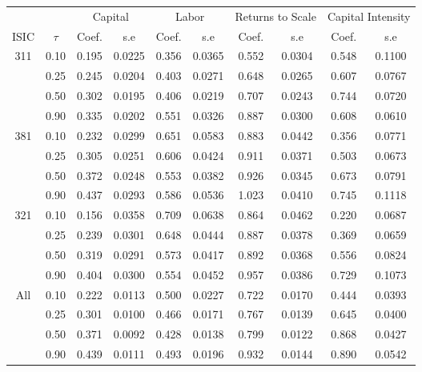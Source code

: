 \begin{table}[H]
\centering
\begin{tabular}{cccccccccc}
  \hline\hline & & \multicolumn{2}{c}{Capital}  & \multicolumn{2}{c}{Labor} & \multicolumn{2}{c}{Returns to Scale} & \multicolumn{2}{c}{Capital Intensity}\\ \cmidrule(lr){3-4} \cmidrule(lr){5-6} \cmidrule(lr){7-8} \cmidrule(lr){9-10}ISIC & $\tau$ & Coef. & s.e & Coef. & s.e & Coef. & s.e & Coef. & s.e \\ 
  \hline
311 & 0.10 & 0.195 & 0.0225 & 0.356 & 0.0365 & 0.552 & 0.0304 & 0.548 & 0.1100 \\ 
   & 0.25 & 0.245 & 0.0204 & 0.403 & 0.0271 & 0.648 & 0.0265 & 0.607 & 0.0767 \\ 
   & 0.50 & 0.302 & 0.0195 & 0.406 & 0.0219 & 0.707 & 0.0243 & 0.744 & 0.0720 \\ 
   & 0.90 & 0.335 & 0.0202 & 0.551 & 0.0326 & 0.887 & 0.0300 & 0.608 & 0.0610 \\ 
  381 & 0.10 & 0.232 & 0.0299 & 0.651 & 0.0583 & 0.883 & 0.0442 & 0.356 & 0.0771 \\ 
   & 0.25 & 0.305 & 0.0251 & 0.606 & 0.0424 & 0.911 & 0.0371 & 0.503 & 0.0673 \\ 
   & 0.50 & 0.372 & 0.0248 & 0.553 & 0.0382 & 0.926 & 0.0345 & 0.673 & 0.0791 \\ 
   & 0.90 & 0.437 & 0.0293 & 0.586 & 0.0536 & 1.023 & 0.0410 & 0.745 & 0.1118 \\ 
  321 & 0.10 & 0.156 & 0.0358 & 0.709 & 0.0638 & 0.864 & 0.0462 & 0.220 & 0.0687 \\ 
   & 0.25 & 0.239 & 0.0301 & 0.648 & 0.0444 & 0.887 & 0.0378 & 0.369 & 0.0659 \\ 
   & 0.50 & 0.319 & 0.0291 & 0.573 & 0.0417 & 0.892 & 0.0368 & 0.556 & 0.0824 \\ 
   & 0.90 & 0.404 & 0.0300 & 0.554 & 0.0452 & 0.957 & 0.0386 & 0.729 & 0.1073 \\ 
  All & 0.10 & 0.222 & 0.0113 & 0.500 & 0.0227 & 0.722 & 0.0170 & 0.444 & 0.0393 \\ 
   & 0.25 & 0.301 & 0.0100 & 0.466 & 0.0171 & 0.767 & 0.0139 & 0.645 & 0.0400 \\ 
   & 0.50 & 0.371 & 0.0092 & 0.428 & 0.0138 & 0.799 & 0.0122 & 0.868 & 0.0427 \\ 
   & 0.90 & 0.439 & 0.0111 & 0.493 & 0.0196 & 0.932 & 0.0144 & 0.890 & 0.0542 \\ 
   \hline
\end{tabular}
\end{table}
